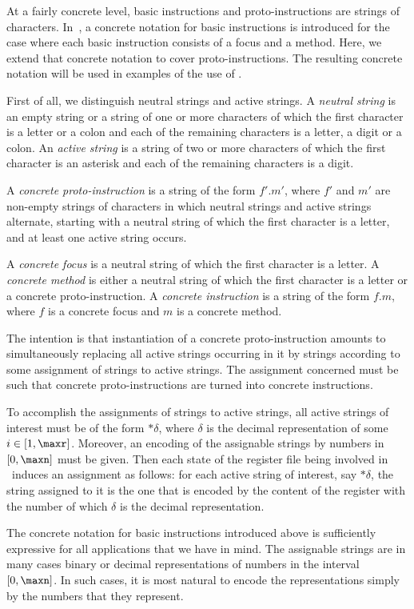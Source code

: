 \documentclass[fleqn]{llncs}
\begin{document}
At a fairly concrete level, basic instructions and proto-instructions
are strings of characters.
In~\cite{BL02a}, a concrete notation for basic instructions is
introduced for the case where each basic instruction consists of a focus
and a method.
Here, we extend that concrete notation to cover proto-instructions.
The resulting concrete notation will be used in examples of the use
of \PGLDdii.

First of all, we distinguish neutral strings and active strings.
A \emph{neutral string} is an empty string or a string of one or more
characters of which the first character is a letter or a colon and each
of the remaining characters is a letter, a digit or a colon.
An \emph{active string} is a string of two or more characters of which
the first character is an asterisk and each of the remaining characters
is a digit.

A \emph{concrete proto-instruction} is a string of the form $f'.m'$,
where $f'$ and $m'$ are non-empty strings of characters in which neutral
strings and active strings alternate, starting with a neutral string of
which the first character is a letter, and at least one active string
occurs.

A \emph{concrete focus} is a neutral string of which the first character
is a letter.
A \emph{concrete method} is either a neutral string of which the first
character is a letter or a concrete proto-instruction.
A \emph{concrete instruction} is a string of the form $f.m$, where $f$
is a concrete focus and $m$ is a concrete method.

The intention is that instantiation of a concrete proto-instruction
amounts to simultaneously replacing all active strings occurring in it
by strings according to some assignment of strings to active strings.
The assignment concerned must be such that concrete proto-instructions
are turned into concrete instructions.

To accomplish the assignments of strings to active strings, all
active strings of interest must be of the form ${*}\delta$, where
$\delta$ is the decimal representation of some $i \in [1,\maxr]$.
Moreover, an encoding of the assignable strings by numbers in
$[0,\maxn]$ must be given.
Then each state of the register file being involved in \PGLDdii\ induces
an assignment as follows: for each active string of interest, say
${*}\delta$, the string assigned to it is the one that is encoded by the
content of the register with the number of which $\delta$ is the decimal
representation.

The concrete notation for basic instructions introduced above is
sufficiently expressive for all applications that we have in mind.
The assignable strings are in many cases binary or decimal
representations of numbers in the interval $[0,\maxn]$.
In such cases, it is most natural to encode the representations simply
by the numbers that they represent.
\end{document}
